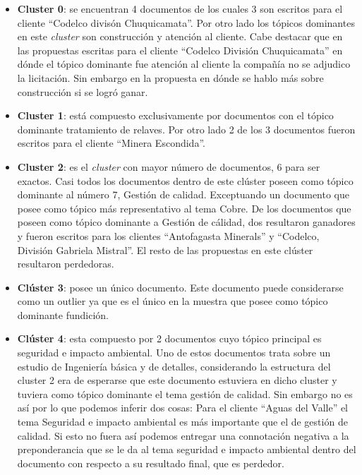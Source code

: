     \begin{itemize}
        \item \textbf{Cluster 0}: se encuentran 4 documentos de los cuales 3 son escritos para el cliente ``Codelco divisón Chuquicamata''. Por otro lado los tópicos dominantes en este \textit{cluster} son construcción y atención al cliente. Cabe destacar que en las propuestas escritas para el cliente ``Codelco División Chuquicamata'' en dónde el tópico dominante fue atención al cliente la compañía no se adjudico la licitación. Sin embargo en la propuesta en dónde se hablo más sobre construcción si se logró ganar. 
        \item \textbf{Cluster 1}: está compuesto exclusivamente por documentos con el tópico dominante tratamiento de relaves. Por otro lado 2 de los 3 documentos fueron escritos para el cliente ``Minera Escondida''.
        \item \textbf{Cluster 2}: es el \textit{cluster} con mayor número de documentos, 6 para ser exactos. Casi todos los documentos dentro de este clúster poseen como tópico dominante al número 7, Gestión de calidad. Exceptuando un documento que posee como tópico más representativo al tema Cobre. De los documentos que poseen como tópico dominante a Gestión de cálidad, dos resultaron ganadores y fueron escritos para los clientes ``Antofagasta Minerals'' y ``Codelco, División Gabriela Mistral''. El resto de las propuestas en este clúster resultaron perdedoras. 
        \item \textbf{Clúster 3}:  posee un único documento. Este documento puede considerarse como un outlier ya que es el único en la muestra que posee como tópico dominante fundición.
        \item \textbf{Clúster 4}: esta compuesto por 2 documentos cuyo tópico principal es seguridad e impacto ambiental. Uno de estos documentos trata sobre un estudio de Ingeniería básica y de detalles, considerando la estructura del cluster 2 era de esperarse que este documento estuviera en dicho cluster y tuviera como tópico dominante el tema gestión de calidad. Sin embargo no es así por lo que podemos inferir dos cosas: Para el cliente ``Aguas del Valle'' el tema Seguridad e impacto ambiental es más importante que el de gestión de calidad. Si esto no fuera así podemos entregar una connotación negativa a la preponderancia que se le da al tema seguridad e impacto ambiental dentro del documento con respecto a su resultado final, que es perdedor.
    \end{itemize}
    
